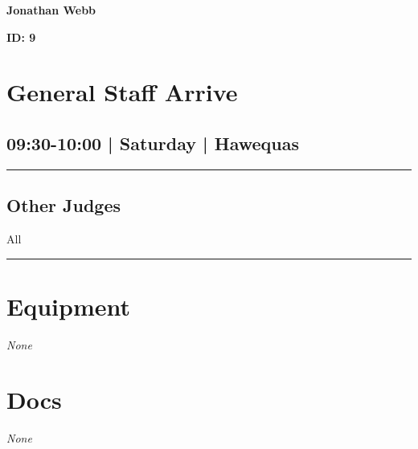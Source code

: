 \documentclass[10pt, A5]{article}
\newcommand{\newtitle}[1]{\begin{center}{\Huge\bfseries #1 }\\ \vspace{5mm}\end{center}}
\newcommand{\newsubtitle}[1]{\begin{center}{\color{grey}\Large\bfseries #1 }\\ \vspace{5mm}\end{center}}
\begin{document}
		\newtitle{Jonathan Webb}
	\newsubtitle{ID: 9}


        \begin{framed}
        \begin{minipage}{\textwidth}

        \setcounter{section}{2}
        \section{General Staff Arrive}
        \subsection*{09:30-10:00 | Saturday | Hawequas}

        \vspace{0.25cm}
        \hrule
        \vspace{0.25cm}


        \subsection*{Other Judges}
                    All

            \vspace{0.25cm}
        \hrule
        \vspace{0.25cm}

        \begin{multicols}{2}

		\section*{\faWrench \: Equipment}

				\textit{None}
		
		\vfill\null
		\columnbreak

			\section*{\faFile \: Docs}
		 	\textit{None}
	

		\vfill\null

		\end{multicols}
\end{minipage}
\end{framed}
\end{document}
